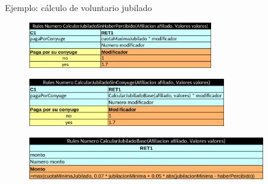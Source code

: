 \documentclass[10pt]{beamer}
\begin{document}
\begin{frame}{Ejemplo: cálculo de voluntario jubilado}
    \begin{figure}
        \centering
        \includegraphics[width=0.7\textwidth]{tables/jubiladoSinHaber.png}
    \end{figure}
\end{frame}

\begin{frame}
    \begin{figure}
        \centering
        \includegraphics[width=0.75\textwidth]{tables/jubiladoSinConyuge.png}
    \end{figure}
    \begin{figure}
        \centering
        \includegraphics[width=0.9\textwidth]{tables/jubiladoBase.png}
    \end{figure}
\end{frame} 

\end{document}
